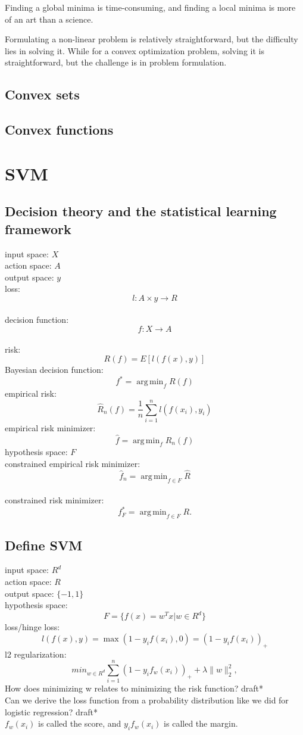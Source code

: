 \documentclass{report}
\DeclareMathOperator*{\argmin}{arg\,min}
\begin{document}
Finding a global minima is time-consuming, and finding a local minima is more of an art than a science.

Formulating a non-linear problem is relatively straightforward, but the difficulty lies in solving it. While for a convex optimization problem, solving it is straightforward, but the challenge is in problem formulation. 

\section{Convex sets}

\section{Convex functions}

\chapter{SVM}
\section{Decision theory and the statistical learning framework}
{\noindent input space: $X$}\\
action space: $A$\\
output space: $y$\\
loss: \[ l: A \times y \to R\]\\
decision function: \[ f: X \to A\] \\
risk: \[R(f) = E[l(f(x), y)] \]
Bayesian decision function: \[ f^{\ast} = \argmin_{f} R(f) \]
empirical risk: \[
\hat{R}_n(f) = \frac{1}{n} \sum_{i=1}^{n} l(f(x_i), y_i)\]
empirical risk minimizer: \[
	\hat{f} = \argmin_{f} \hat{R}_n(f)
\] 
hypothesis space: $F$ \\
constrained empirical risk minimizer: \[
	\hat{f}_{n} = \argmin_{f \in F} \hat{R}
\] \\
constrained risk minimizer: \[
	f^{\ast}_{F} = \argmin_{f \in F} R
.\] 

\section{Define SVM}

{\noindent input space: $R^d$} \\
action space: $R$ \\
output space: $\{-1, 1\}$\\
hypothesis space: \[ F = \{ f(x) = w^T x | w \in R^d\}\]
loss/hinge loss: \[ l\left( f(x), y \right) = \max(1 - y_if(x_i), 0) = \left( 1 - y_if(x_i) \right)_+ \]
l2 regularization: \[
	min_{w \in R^d}\sum_{i=1}^{n} \left( 1 -y_if_w(x_i) \right)_+ + \lambda\|w\|_2^2 
,\] 
How does minimizing w relates to minimizing the risk function? draft*\\
Can we derive the loss function from a probability distribution like we did for logistic regression? draft*\\
$f_w(x_i)$ is called the score, and $y_if_w(x_i)$ is called the margin.
\end{document}
